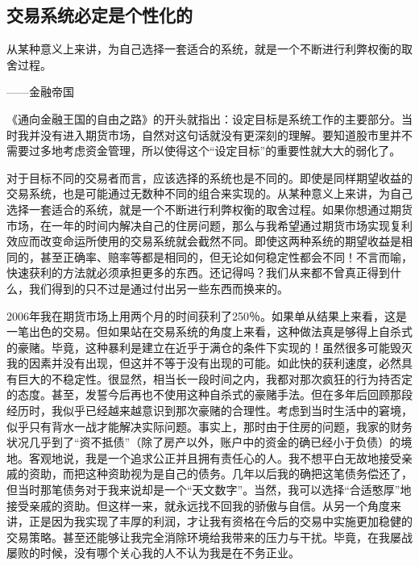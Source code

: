\subsection{交易系统必定是个性化的}

{\kaishu
从某种意义上来讲，为自己选择一套适合的系统，就是一个不断进行利弊权衡的取舍过程。

\hfill ——金融帝国
}

《通向金融王国的自由之路》的开头就指出：设定目标是系统工作的主要部分。当时我并没有进入期货市场，自然对这句话就没有更深刻的理解。要知道股市里并不需要过多地考虑资金管理，所以使得这个“设定目标”的重要性就大大的弱化了。

对于目标不同的交易者而言，应该选择的系统也是不同的。即使是同样期望收益的交易系统，也是可能通过无数种不同的组合来实现的。从某种意义上来讲，为自己选择一套适合的系统，就是一个不断进行利弊权衡的取舍过程。如果你想通过期货市场，在一年的时间内解决自己的住房问题，那么与我希望通过期货市场实现复利效应而改变命运所使用的交易系统就会截然不同。即使这两种系统的期望收益是相同的，甚至正确率、赔率等都是相同的，但无论如何稳定性都会不同！不言而喻，快速获利的方法就必须承担更多的东西。还记得吗？我们从来都不曾真正得到什么，我们得到的只不过是通过付出另一些东西而换来的。

2006年我在期货市场上用两个月的时间获利了250％。如果单从结果上来看，这是一笔出色的交易。但如果站在交易系统的角度上来看，这种做法真是够得上自杀式的豪赌。毕竟，这种暴利是建立在近乎于满仓的条件下实现的！虽然很多可能毁灭我的因素并没有出现，但这并不等于没有出现的可能。如此快的获利速度，必然具有巨大的不稳定性。很显然，相当长一段时间之内，我都对那次疯狂的行为持否定的态度。甚至，发誓今后再也不使用这种自杀式的豪赌手法。但在多年后回顾那段经历时，我似乎已经越来越意识到那次豪赌的合理性。考虑到当时生活中的窘境，似乎只有背水一战才能解决实际问题。事实上，那时由于住房的问题，我家的财务状况几乎到了“资不抵债”（除了房产以外，账户中的资金的确已经小于负债）的境地。客观地说，我是一个追求公正并且拥有责任心的人。我不想平白无故地接受亲戚的资助，而把这种资助视为是自己的债务。几年以后我的确把这笔债务偿还了，但当时那笔债务对于我来说却是一个“天文数字”。当然，我可以选择“合适憨厚”地接受亲戚的资助。但这样一来，就永远找不回我的骄傲与自信。从另一个角度来讲，正是因为我实现了丰厚的利润，才让我有资格在今后的交易中实施更加稳健的交易策略。甚至还能够让我完全消除环境给我带来的压力与干扰。毕竟，在我屡战屡败的时候，没有哪个关心我的人不认为我是在不务正业。

